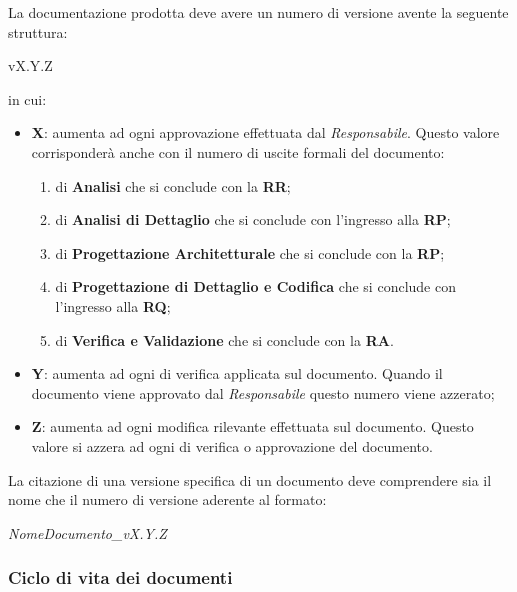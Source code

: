 \documentclass{scalatekids-article}
\begin{document}
La documentazione prodotta deve avere un numero di versione avente la seguente struttura:\\
\begin{center}
  vX.Y.Z
\end{center}
in cui:
\begin{itemize}
\item \textbf{X}: aumenta  ad ogni approvazione effettuata dal \textit{Responsabile}. Questo valore corrisponderà anche con il numero di uscite formali del documento:
  \begin{enumerate}
  \item{} di \textbf{Analisi} che si conclude con la \textbf{RR};
  \item{} di \textbf{Analisi di Dettaglio} che si conclude con l'ingresso alla \textbf{RP};
  \item{} di \textbf{Progettazione Architetturale} che si conclude con la \textbf{RP};
  \item{} di \textbf{Progettazione di Dettaglio e Codifica} che si conclude con l'ingresso alla \textbf{RQ};
  \item{} di \textbf{Verifica e Validazione} che si conclude con la \textbf{RA}.
  \end{enumerate}
\item \textbf{Y}: aumenta ad ogni  di verifica applicata sul documento. Quando il documento viene approvato dal \textit{Responsabile} questo numero viene azzerato;
\item \textbf{Z}: aumenta ad ogni modifica rilevante effettuata sul documento. Questo valore si azzera ad ogni  di verifica o approvazione del documento.
\end{itemize}
La citazione di una versione specifica di un documento deve comprendere sia il nome che il numero di versione aderente al formato:
\begin{center}
  \textit{NomeDocumento\_vX.Y.Z}
\end{center}

\subsubsection{Ciclo di vita dei documenti}
\end{document}
